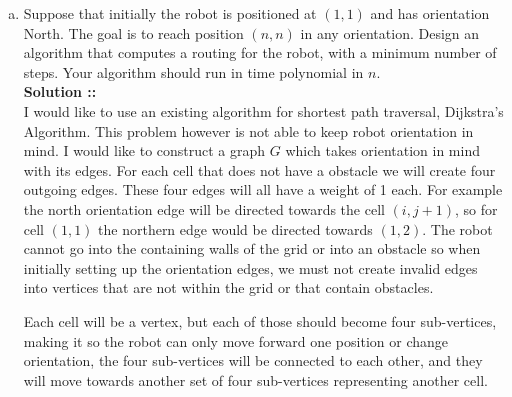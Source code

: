 \documentclass[11pt]{article}
\begin{document}
\begin{enumerate}[(a)]
\item
Suppose that initially the robot is positioned at $(1, 1)$ and has orientation North.
The goal is to reach position $(n, n)$ in any orientation. Design an algorithm that 
computes a routing for the robot, with a minimum number of steps. Your algorithm should
run in time polynomial in $n$. \\
\vspace{5px}\textbf{Solution ::} \\
I would like to use an existing algorithm for shortest path traversal, Dijkstra's
Algorithm. This problem however is not able to keep robot orientation in mind. I
would like to construct a graph $G$ which takes orientation in mind with its edges.
For each cell that does not have a obstacle we will create four outgoing edges.
These four edges will all have a weight of 1 each. For example the north orientation
edge will be directed towards the cell $(i, j+1)$, so for cell $(1, 1)$ the northern
edge would be directed towards $(1, 2)$. The robot cannot go into the containing walls
of the grid or into an obstacle so when initially setting up the orientation edges, 
we must not create invalid edges into vertices that are not within the grid or that
contain obstacles.

Each cell will be a vertex, but each of those should become four sub-vertices, making
it so the robot can only move forward one position or change orientation, the four 
sub-vertices will be connected to each other, and they will move towards another set of 
four sub-vertices representing another cell.


\end{enumerate}
\end{document}

